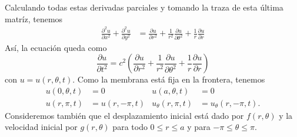 \documentclass[11pt,letterpaper,draft]{report}
\newcommand\<{\langle}
\renewcommand\>{\rangle}
\begin{document}
Calculando todas estas derivadas parciales
y tomando la traza de esta última matríz, tenemos
\begin{align*}
  \frac{\partial^{2} u}{\partial x^{2}}
  +
  \frac{\partial^{2} u}{\partial y^{2}}
  &=
  \frac{\partial u}{\partial r^{2}}
  +
  \frac{1}{r^{2}}\frac{\partial u}{\partial \theta^{2}}
  +
  \frac{1}{r}\frac{\partial u}{\partial r}
\end{align*}
Así, la ecuación queda como
\[
  \frac{\partial u}{\partial t^{2}}
  =c^{2}
  \left(
    \frac{\partial u}{\partial r^{2}}
    +
    \frac{1}{r^{2}}\frac{\partial u}{\partial \theta^{2}}
    +
    \frac{1}{r}\frac{\partial u}{\partial r}
  \right)
\]
con $u=u(r,\theta,t)$.
Como la membrana está fija en la frontera, tenemos
\begin{align*}
  u(0,\theta,t)&= 0 & u(a,\theta,t)&= 0 \\
  u(r,\pi,t)&=u(r,-\pi,t) & u_\theta(r,\pi,t)&=u_\theta(r,-\pi,t).
\end{align*}
Consideremos también que el desplazamiento inicial está dado por
$f(r,\theta)$ y la velocidad inicial por $g(r,\theta)$ para todo
$0\leq r\leq a$ y para $-\pi\leq\theta\leq\pi$.
\end{document}

